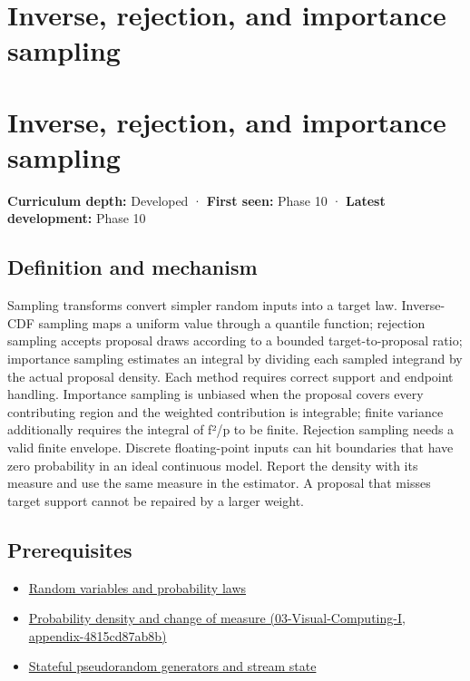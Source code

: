 \hypertarget{appendix-8d863ed954d0}{}
\section*{Inverse, rejection, and importance sampling}
\section{Inverse, rejection, and importance sampling}\label{appendix-8d863ed954d0-inverse-rejection-and-importance-sampling}

\textbf{Curriculum depth:} Developed · \textbf{First seen:} Phase 10 · \textbf{Latest development:} Phase 10

\subsection{Definition and mechanism}\label{appendix-8d863ed954d0-definition-and-mechanism}

Sampling transforms convert simpler random inputs into a target law. Inverse-CDF sampling maps a uniform value through a quantile function; rejection sampling accepts proposal draws according to a bounded target-to-proposal ratio; importance sampling estimates an integral by dividing each sampled integrand by the actual proposal density. Each method requires correct support and endpoint handling. Importance sampling is unbiased when the proposal covers every contributing region and the weighted contribution is integrable; finite variance additionally requires the integral of f²/p to be finite. Rejection sampling needs a valid finite envelope. Discrete floating-point inputs can hit boundaries that have zero probability in an ideal continuous model. Report the density with its measure and use the same measure in the estimator. A proposal that misses target support cannot be repaired by a larger weight.

\subsection{Prerequisites}\label{appendix-8d863ed954d0-prerequisites}

\begin{itemize}
\tightlist
\item
  \hyperref[appendix-4d0203f7944f]{Random variables and probability laws}
\item
  \href{../03-Visual-Computing-I/main.pdf\#nameddest=appendix-4815cd87ab8b}{Probability density and change of measure (03-Visual-Computing-I, appendix-4815cd87ab8b)}
\item
  \hyperref[appendix-e0f7c7e08f3a]{Stateful pseudorandom generators and stream state}
\end{itemize}

